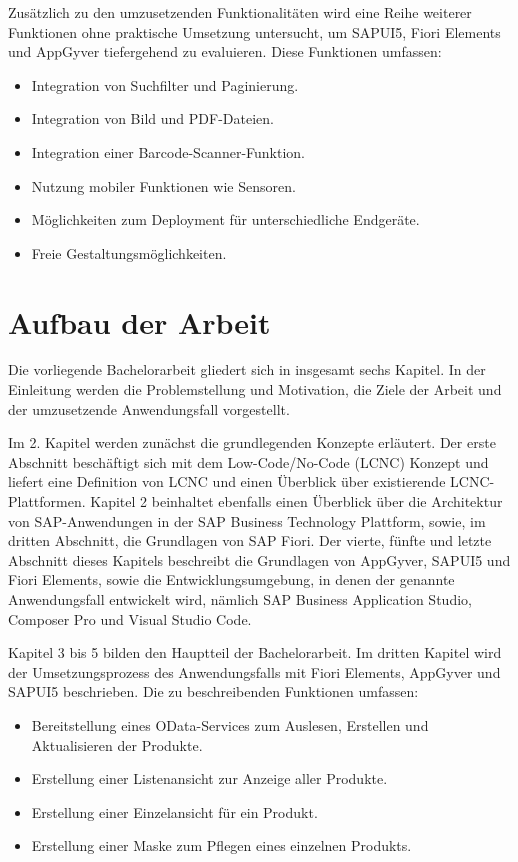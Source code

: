 Zusätzlich zu den umzusetzenden Funktionalitäten wird eine Reihe weiterer Funktionen ohne praktische Umsetzung untersucht, um SAPUI5, Fiori Elements und AppGyver tiefergehend zu evaluieren. Diese Funktionen umfassen:
\begin{itemize}[noitemsep]
\item Integration von Suchfilter und Paginierung.
\item Integration von Bild und PDF-Dateien.
\item Integration einer Barcode-Scanner-Funktion.
\item Nutzung mobiler Funktionen wie Sensoren.
\item Möglichkeiten zum Deployment für unterschiedliche Endgeräte.
\item Freie Gestaltungsmöglichkeiten.
\end{itemize}

\section{Aufbau der Arbeit}
Die vorliegende Bachelorarbeit gliedert sich in insgesamt sechs Kapitel. In der Einleitung werden die Problemstellung und Motivation, die Ziele der Arbeit und der umzusetzende Anwendungsfall vorgestellt.

Im 2. Kapitel werden zunächst die grundlegenden Konzepte erläutert. Der erste Abschnitt beschäftigt sich mit dem Low-Code/No-Code (LCNC) Konzept und liefert eine Definition von LCNC und einen Überblick über existierende LCNC-Plattformen. Kapitel 2 beinhaltet ebenfalls einen Überblick über die Architektur von SAP-Anwendungen in der SAP Business Technology Plattform, sowie, im dritten Abschnitt, die Grundlagen von SAP Fiori. Der vierte, fünfte und letzte Abschnitt dieses Kapitels beschreibt die Grundlagen von AppGyver, SAPUI5 und Fiori Elements, sowie die Entwicklungsumgebung, in denen der genannte Anwendungsfall entwickelt wird, nämlich SAP Business Application Studio, Composer Pro und Visual Studio Code.

Kapitel 3 bis 5 bilden den Hauptteil der Bachelorarbeit. Im dritten Kapitel wird der Umsetzungsprozess des Anwendungsfalls mit Fiori Elements, AppGyver und SAPUI5 beschrieben. Die zu beschreibenden Funktionen umfassen: 
\begin{itemize}[noitemsep]
\item Bereitstellung eines OData-Services zum Auslesen, Erstellen und Aktualisieren der Produkte.
\item Erstellung einer Listenansicht zur Anzeige aller Produkte.
\item Erstellung einer Einzelansicht für ein Produkt.
\item Erstellung einer Maske zum Pflegen eines einzelnen Produkts.
\end{itemize}

